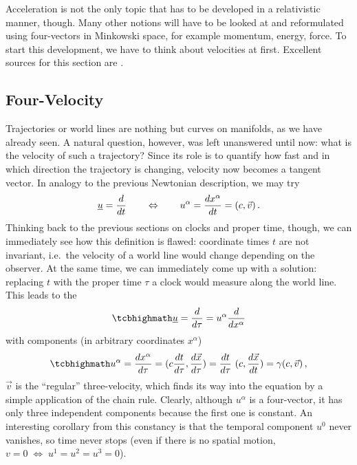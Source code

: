 \documentclass[../relativity_main.tex]{subfiles}
\begin{document}
Acceleration is not the only topic that has to be developed in a relativistic manner, though. Many other notions will have to be looked at and reformulated using four-vectors in Minkowski space, for example momentum, energy, force. To start this development, we have to think about velocities at first. Excellent sources for this section are \cite{Fleury_2019, Faraoni_2013}.





		\subsection{Four-Velocity}
Trajectories or world lines are nothing but curves on manifolds, as we have already seen. A natural question, however, was left unanswered until now: what is the velocity of such a trajectory? Since its role is to quantify how fast and in which direction the trajectory is changing, velocity now becomes a tangent vector. In analogy to the previous Newtonian description, we may try
\begin{equation}
	\underline{u} = \dv{t}
	\qquad \Leftrightarrow \qquad
	u^\alpha = \dv{x^\alpha}{t} = (c, \vec{v}) \, .
\end{equation}
Thinking back to the previous sections on clocks and proper time, though, we can immediately see how this definition is flawed: coordinate times $t$ are not invariant, i.e.~the velocity of a world line would change depending on the observer. At the same time, we can immediately come up with a solution: replacing $t$ with the proper time $\tau$ a clock would measure along the world line. This leads to the 
\begin{equation}\label{eq:four_velocity}
	\eqbox{
	\fvec{u} = \dv{\tau} = u^\alpha \dv{x^\alpha}
	}
\end{equation}
with components (in arbitrary coordinates $x^\alpha$)
\begin{equation}\label{eq:four_velocity_components}
	\eqbox{
	u^\alpha = \dv{x^\alpha}{\tau} = (c \dv{t}{\tau}, \dv{\vec{x}}{\tau}) = \dv{t}{\tau}~ (c, \dv{\vec{x}}{t}) = \gamma \qty(c, \vec{v})
	} \, ,
\end{equation}
$\vec{v}$ is the \enquote{regular} three-velocity, which finds its way into the equation by a simple application of the chain rule. Clearly, although $u^\alpha$ is a four-vector, it has only three independent components because the first one is constant. An interesting corollary from this constancy is that the temporal component $u^0$ never vanishes, so time never stops (even if there is no spatial motion, $v = 0\; \Leftrightarrow \; u^1 = u^2 = u^3 = 0$).
\end{document}
